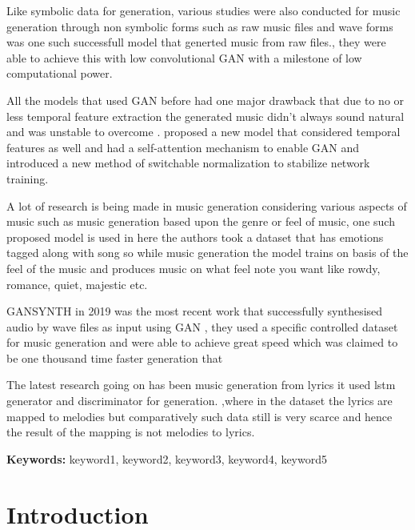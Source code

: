 \documentclass[oneside,12pt]{Classes/RoboticsLaTeX}
\begin{document}
\begin{abstracts}
  Like symbolic data for generation, various studies were also conducted for music generation through non symbolic forms such as raw music files and wave forms \cite{mp3net} was one such successfull model that generted music from raw files., they were able to achieve this with low convolutional GAN with a milestone of low computational power.
  
  All the models that used GAN before had one major drawback that due to no or less temporal feature extraction the generated music didn't always sound natural and was unstable to overcome .\cite{dmbgan} proposed a new model that considered temporal features as well and had a self-attention mechanism to enable GAN and introduced a new method of switchable normalization to stabilize network training.
  
  A lot of research is being made in music generation considering various aspects of music such as music generation based upon the genre or feel of music, one such proposed model is used in \cite{cvaegan} here the authors took a dataset that has emotions tagged along with song so while music generation the model trains on basis of the feel of the music and produces music on what feel note you want like rowdy, romance, quiet, majestic etc.
  
  GANSYNTH in 2019 was the  most recent work that successfully synthesised audio by wave files as input using GAN , they used a specific controlled dataset for music generation and were able to achieve great speed which was claimed to be one thousand time faster generation that \cite{wavenet}
  
  The latest research going on has been music generation from lyrics \cite{lstmgan} it used lstm generator and discriminator for generation. ,where in the dataset the lyrics are mapped to melodies but comparatively such data still is very scarce and hence the result of the mapping is not melodies to lyrics.

\textbf{Keywords: } keyword1, keyword2, keyword3, keyword4, keyword5
\end{abstracts}


\tableofcontents
\listoffigures
\listoftables
\printglossary[title=List of Acronyms,type=\acronymtype]

\mainmatter

\chapter{Introduction}
\label{chap:introduction}
\end{document}
